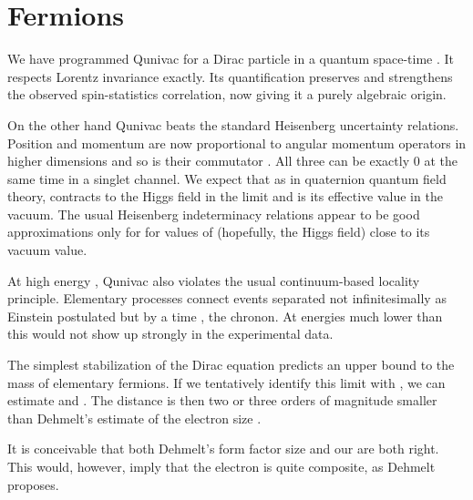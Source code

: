 \documentclass[a4paper,11pt]{article}
\begin{document}
\section{Fermions}

We have programmed Qunivac for a
Dirac particle 
in a quantum space-time \cite{GALIA}.
It
respects Lorentz invariance exactly.
Its quantification
preserves  and strengthens 
the observed spin-statistics correlation,
now
giving it
 a purely algebraic origin.

On the other hand  Qunivac beats
 the standard Heisenberg uncertainty relations.
Position and momentum are now
proportional to angular momentum operators
in higher dimensions
and so is their commutator  \myHighlight{$\eta$}\coordHE{} \cite{GALIA}.
All three can be exactly 0
at the same time
in a singlet channel.
We expect that as in quaternion quantum field theory,
\myHighlight{$\eta$}\coordHE{} contracts to the  Higgs field 
in the limit \coordHE{}
and \coordHE{} is its effective value
in the vacuum.
The usual Heisenberg indeterminacy relations 
appear to be good
approximations only for  
for values of \myHighlight{$\eta$}\coordHE{} (hopefully,
the Higgs field)
close to its vacuum value.

At high energy 
\myHighlight{$\sim \Delta\epsilon$}\coordHE{}\/,
Qunivac also violates
 the usual continuum-based locality
principle.
Elementary processes connect
events separated 
not infinitesimally as Einstein postulated but by 
a time \myHighlight{$\Delta \tau$}\coordHE{}, the chronon.
At energies much lower than \myHighlight{$\Delta \epsilon=\hbar /\Delta \tau$}\coordHE{}
 this would not 
show up strongly in the experimental data.

The simplest stabilization of the Dirac equation
predicts an upper bound \coordHE{}
to the mass of elementary fermions.
If we tentatively identify
this limit with  \coordHE{},
we can estimate
\myHighlight{$\Delta \epsilon$}\coordHE{} and  \myHighlight{$\Delta \tau = \Delta \epsilon/\hbar$}\coordHE{}.
The distance \coordHE{}
is then  two or  three orders of magnitude smaller 
than Dehmelt's estimate
of the electron size
\cite{DEHMELT}.

It is conceivable that both Dehmelt's 
form factor size and our \myHighlight{$\Delta \tau$}\coordHE{} are both right.
This would, however, imply  that the electron
is quite composite,  as Dehmelt proposes.
\end{document}
